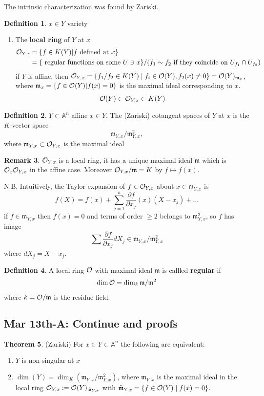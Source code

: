 \documentclass[11pt]{article}
\theoremstyle{definition}
\newtheorem{thm}{Theorem}[section]
\newtheorem{dfn}[thm]{Definition}
\newtheorem{rmk}[thm]{Remark}
\newcommand{\affn}{\mathbb A}
\newcommand{\scm}{{\mathfrak m}}
\newcommand{\calo}{{\cal O}}
\newcommand{\pd}{\partial}
\begin{document}
The intrinsic characterization was found by Zariski. 
\begin{dfn}
$x\in Y$ variety
\begin{enumerate}[label=(\arabic*)]
\item The \textbf{local ring} of $Y$ at $x$
$$
\begin{aligned}
\calo_{Y,x}&=\{f\in K(Y)|f\text{ defined  at } x\}\\
&=\{\text{ regular functions on some } U\ni x\}/(f_1\sim f_2\text{ if they coincide on } U_{f_1}\cap U_{f_2})
\end{aligned}
$$
if $Y$ is affine, then $\calo_{Y,x}=\{f_1/f_2\in K(Y) \mid f_i\in\calo(Y),f_2(x)\neq 0\}=\calo(Y)_{\scm_x}$, where $\scm_x=\{f\in\calo(Y)|f(x)=0\}$ is the maximal ideal corresponding to $x$.
$$
\calo(Y)\subset\calo_{Y,x}\subset K(Y)
$$
\end{enumerate}
\end{dfn}
\begin{dfn}
$Y\subset \affn^n$ affine $x\in Y$. The (Zariski) cotangent spaces of $Y$ at $x$ is the $K$-vector space
$$
\scm_{Y,x}/\scm_{Y,x}^2,
$$
where $\scm_{Y,x}\subset \calo_{Y,x}$ is the maximal ideal 
\end{dfn}
\begin{rmk}
$\calo_{Y,x}$ is a local ring, it has a unique maximal ideal $\scm$ which is $\calo_x\calo_{Y,x}$ in the affine case. Moreover $\calo_{Y,x}/\scm=K$ by $f\mapsto f(x)$.
\end{rmk}

N.B. Intuitively,  the Taylor expansion of $f\in \calo_{Y,x}$ about $x\in\scm_{Y,x}$ is
$$
f(X)=f(x)+\sum^n_{j=1}\frac{\pd f}{\pd x_j}(x)(X-x_j)+\dots
$$
if $f\in\scm_{Y,x}$ then $f(x)=0$ and terms of order $\geq 2$ belongs to $\scm_{Y,x}^2$, so $f$ has image
$$
\sum \frac{\pd f}{\pd x_j}dX_j\in \scm_{Y,x}/\scm_{Y,x}^2
$$
where $dX_j=X-x_j$.



\begin{dfn}
A local ring $\calo$ with maximal ideal $\scm$ is callled \textbf{regular} if 
$$
\dim \calo= \dim_k \scm/\scm^2
$$
where $k=\calo/\scm$ is the residue field.
\end{dfn}

\subsection{Mar 13th-A: Continue and proofs}
\begin{thm}(Zariski)
	For $x\in Y\subset \affn^n$ the following are equivalent:
	\begin{enumerate}[label=(\arabic*)]
		\item
		$Y$ is non-singular at $x$
		\item $\dim(Y)=\dim_K(\scm_{Y,x}/\scm_{Y,x}^2)$, where $\scm_{Y,x}$ is the maximal ideal in the local ring $\calo_{Y,x}:=\calo(Y)_{\tilde{\scm}_{Y,x}}$ with $\tilde{\scm}_{Y,x}=\{f\in\calo(Y)\mid f(x)=0\}$.
	\end{enumerate}
\end{thm}
\end{document}
